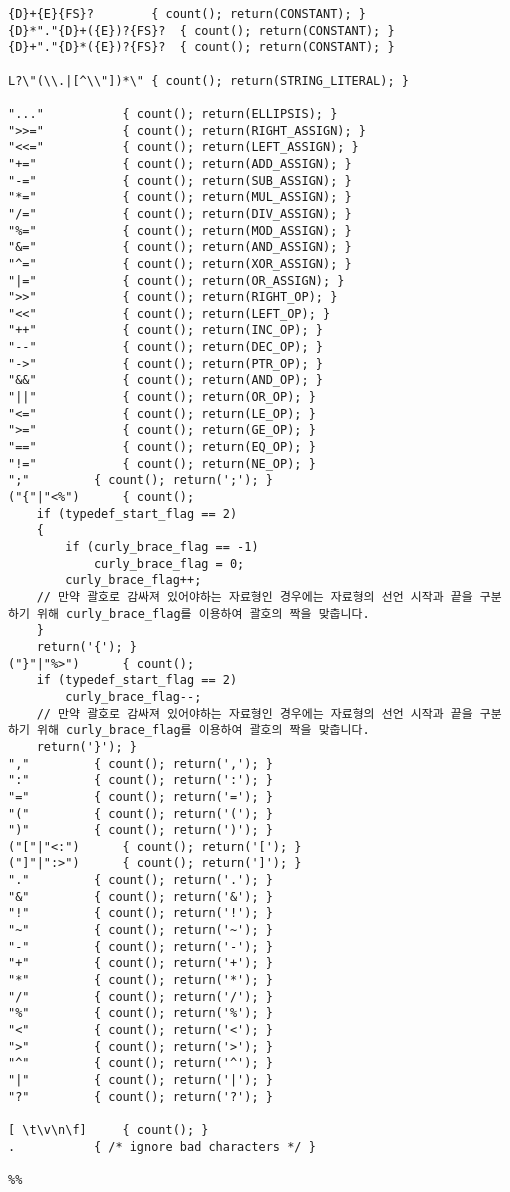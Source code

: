\documentclass[11pt,oneside,a4paper]{article}
\begin{document}
\begin{verbatim}
{D}+{E}{FS}?		{ count(); return(CONSTANT); }
{D}*"."{D}+({E})?{FS}?	{ count(); return(CONSTANT); }
{D}+"."{D}*({E})?{FS}?	{ count(); return(CONSTANT); }

L?\"(\\.|[^\\"])*\"	{ count(); return(STRING_LITERAL); }

"..."			{ count(); return(ELLIPSIS); }
">>="			{ count(); return(RIGHT_ASSIGN); }
"<<="			{ count(); return(LEFT_ASSIGN); }
"+="			{ count(); return(ADD_ASSIGN); }
"-="			{ count(); return(SUB_ASSIGN); }
"*="			{ count(); return(MUL_ASSIGN); }
"/="			{ count(); return(DIV_ASSIGN); }
"%="			{ count(); return(MOD_ASSIGN); }
"&="			{ count(); return(AND_ASSIGN); }
"^="			{ count(); return(XOR_ASSIGN); }
"|="			{ count(); return(OR_ASSIGN); }
">>"			{ count(); return(RIGHT_OP); }
"<<"			{ count(); return(LEFT_OP); }
"++"			{ count(); return(INC_OP); }
"--"			{ count(); return(DEC_OP); }
"->"			{ count(); return(PTR_OP); }
"&&"			{ count(); return(AND_OP); }
"||"			{ count(); return(OR_OP); }
"<="			{ count(); return(LE_OP); }
">="			{ count(); return(GE_OP); }
"=="			{ count(); return(EQ_OP); }
"!="			{ count(); return(NE_OP); }
";"			{ count(); return(';'); }
("{"|"<%")		{ count(); 
	if (typedef_start_flag == 2)
	{
		if (curly_brace_flag == -1)
			curly_brace_flag = 0;
		curly_brace_flag++;
	// 만약 괄호로 감싸져 있어야하는 자료형인 경우에는 자료형의 선언 시작과 끝을 구분하기 위해 curly_brace_flag를 이용하여 괄호의 짝을 맞춥니다.
	}
	return('{'); }
("}"|"%>")		{ count(); 
	if (typedef_start_flag == 2)
		curly_brace_flag--;
	// 만약 괄호로 감싸져 있어야하는 자료형인 경우에는 자료형의 선언 시작과 끝을 구분하기 위해 curly_brace_flag를 이용하여 괄호의 짝을 맞춥니다.
	return('}'); }
","			{ count(); return(','); }
":"			{ count(); return(':'); }
"="			{ count(); return('='); }
"("			{ count(); return('('); }
")"			{ count(); return(')'); }
("["|"<:")		{ count(); return('['); }
("]"|":>")		{ count(); return(']'); }
"."			{ count(); return('.'); }
"&"			{ count(); return('&'); }
"!"			{ count(); return('!'); }
"~"			{ count(); return('~'); }
"-"			{ count(); return('-'); }
"+"			{ count(); return('+'); }
"*"			{ count(); return('*'); }
"/"			{ count(); return('/'); }
"%"			{ count(); return('%'); }
"<"			{ count(); return('<'); }
">"			{ count(); return('>'); }
"^"			{ count(); return('^'); }
"|"			{ count(); return('|'); }
"?"			{ count(); return('?'); }

[ \t\v\n\f]		{ count(); }
.			{ /* ignore bad characters */ } 

%%


\end{verbatim}
\end{document}
